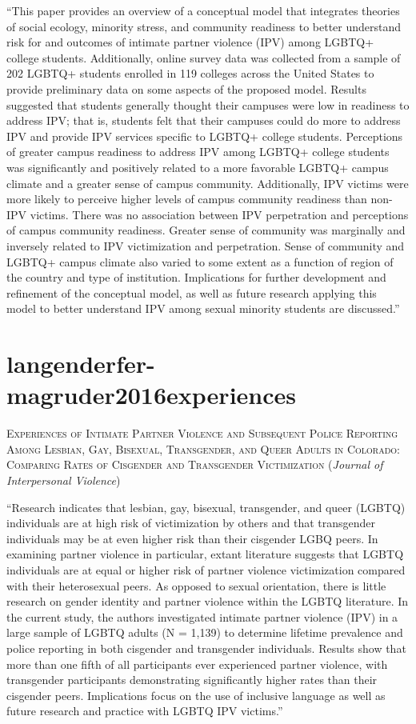 \documentclass[]{tufte-handout}
\begin{document}
``This paper provides an overview of a conceptual model that integrates
theories of social ecology, minority stress, and community readiness to
better understand risk for and outcomes of intimate partner violence
(IPV) among LGBTQ+ college students. Additionally, online survey data
was collected from a sample of 202 LGBTQ+ students enrolled in 119
colleges across the United States to provide preliminary data on some
aspects of the proposed model. Results suggested that students generally
thought their campuses were low in readiness to address IPV; that is,
students felt that their campuses could do more to address IPV and
provide IPV services specific to LGBTQ+ college students. Perceptions of
greater campus readiness to address IPV among LGBTQ+ college students
was significantly and positively related to a more favorable LGBTQ+
campus climate and a greater sense of campus community. Additionally,
IPV victims were more likely to perceive higher levels of campus
community readiness than non-IPV victims. There was no association
between IPV perpetration and perceptions of campus community readiness.
Greater sense of community was marginally and inversely related to IPV
victimization and perpetration. Sense of community and LGBTQ+ campus
climate also varied to some extent as a function of region of the
country and type of institution. Implications for further development
and refinement of the conceptual model, as well as future research
applying this model to better understand IPV among sexual minority
students are discussed.''

\section{\texorpdfstring{\textcolor[HTML]{5b0057}{langenderfer-magruder2016experiences}}{}}\label{section-64}

\textsc{\large{Experiences of Intimate Partner Violence and Subsequent Police Reporting Among Lesbian, Gay, Bisexual, Transgender, and Queer Adults in Colorado: Comparing Rates of Cisgender and Transgender Victimization}}
(\emph{Journal of Interpersonal Violence})

``Research indicates that lesbian, gay, bisexual, transgender, and queer
(LGBTQ) individuals are at high risk of victimization by others and that
transgender individuals may be at even higher risk than their cisgender
LGBQ peers. In examining partner violence in particular, extant
literature suggests that LGBTQ individuals are at equal or higher risk
of partner violence victimization compared with their heterosexual
peers. As opposed to sexual orientation, there is little research on
gender identity and partner violence within the LGBTQ literature. In the
current study, the authors investigated intimate partner violence (IPV)
in a large sample of LGBTQ adults (N = 1,139) to determine lifetime
prevalence and police reporting in both cisgender and transgender
individuals. Results show that more than one fifth of all participants
ever experienced partner violence, with transgender participants
demonstrating significantly higher rates than their cisgender peers.
Implications focus on the use of inclusive language as well as future
research and practice with LGBTQ IPV victims.''
\end{document}
